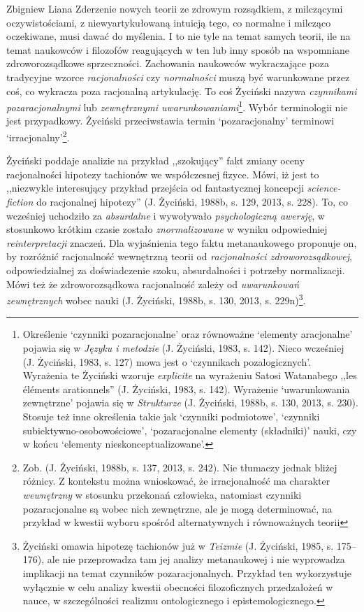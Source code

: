 \begin{artplenv}{Zbigniew Liana}
Zderzenie nowych teorii ze zdrowym rozsądkiem, z milczącymi oczywistościami, z niewyartykułowaną intuicją tego, co
normalne i milcząco oczekiwane, musi dawać do myślenia. I to nie tyle na temat samych teorii, ile na temat naukowców i
filozofów reagujących w ten lub inny sposób na wspomniane zdroworozsądkowe sprzeczności. Zachowania naukowców
wykraczające poza tradycyjne wzorce \textit{racjonalności} czy \textit{normalności} muszą być warunkowane przez coś, co
wykracza poza racjonalną artykulację. To coś Życiński nazywa \textit{czynnikami pozaracjonalnymi} lub \textit{zewnętrznymi
	uwarunkowaniami}\footnote{Określenie ‘czynniki pozaracjonalne’ oraz równoważne ‘elementy aracjonalne’ pojawia się w
	\textit{Języku i metodzie} \label{ref:RNDQuqexwGAtV}(J. Życiński, 1983, s. 142). Nieco wcześniej
	\label{ref:RND8JMQ2LGnoG}(J. Życiński, 1983, s. 127) mowa jest o ‘czynnikach pozalogicznych’. Wyrażenia te Życiński
	wzoruje \textit{explicite} na wyrażeniu Satosi Watanabego ,,les éléments arationnels'' \label{ref:RNDDibcJHr6Ng}(J.
	Życiński, 1983, s. 142). Wyrażenie ‘uwarunkowania zewnętrzne’ pojawia się w \textit{Strukturze}
	\label{ref:RNDmQCXMWkgmK}(J. Życiński, 1988b, s. 130, 2013, s. 230). Stosuje też inne określenia takie jak ‘czynniki
	podmiotowe’, ‘czynniki subiektywno-osobowościowe’, ‘pozaracjonalne elementy\textit{ }(składniki)’ nauki, czy w końcu
	‘elementy nieskonceptualizowane’.}. Wybór terminologii nie jest przypadkowy. Życiński przeciwstawia termin
‘pozaracjonalny’ terminowi ‘irracjonalny’\footnote{Zob. \label{ref:RND4GDp5Hkb8p}(J. Życiński, 1988b, s. 137, 2013, s.
	242). Nie tłumaczy jednak bliżej różnicy. Z kontekstu można wnioskować, że irracjonalność ma charakter \textit{wewnętrzny
	}w stosunku przekonań człowieka, natomiast czynniki pozaracjonalne są wobec nich zewnętrzne, ale je mogą determinować,
	na przykład w kwestii wyboru spośród alternatywnych i równoważnych teorii}.

Życiński poddaje analizie na przykład ,,szokujący'' fakt zmiany oceny racjonalności hipotezy tachionów we współczesnej
fizyce. Mówi, iż jest to ,,niezwykle interesujący przykład przejścia od fantastycznej koncepcji \textit{science-fiction}
do racjonalnej hipotezy'' \label{ref:RNDOVbNCXy3az}(J. Życiński, 1988b, s. 129, 2013, s. 228). To, co wcześniej
uchodziło za \textit{absurdalne} i wywoływało \textit{psychologiczną awersję}, w stosunkowo krótkim czasie zostało
\textit{znormalizowane }w wyniku odpowiedniej \textit{reinterpretacji} znaczeń. Dla wyjaśnienia tego faktu metanaukowego
proponuje on, by rozróżnić racjonalność wewnętrzną teorii od \textit{racjonalności zdroworozsądkowej}, odpowiedzialnej za
doświadczenie szoku, absurdalności i potrzeby normalizacji. Mówi też że zdroworozsądkowa racjonalność zależy od
\textit{uwarunkowań zewnętrznych} wobec nauki \label{ref:RNDDERgYAAw4H}(J. Życiński, 1988b, s. 130, 2013, s.
229n)\footnote{Życiński omawia hipotezę tachionów już w \textit{Teizmie} \label{ref:RNDGRaNeNBaa8}(J. Życiński, 1985, s.
	175–176), ale nie przeprowadza tam jej analizy metanaukowej i nie wyprowadza implikacji na temat czynników
	pozaracjonalnych. Przykład ten wykorzystuje wyłącznie w celu analizy kwestii obecności filozoficznych przedzałożeń w
	nauce, w szczególności realizmu ontologicznego i epistemologicznego.}.


\end{artplenv}
